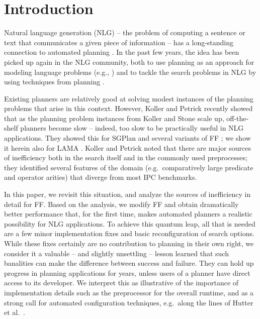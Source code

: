 
\section{Introduction} \label{sec:introduction}

Natural language generation (NLG) -- the problem of computing a
sentence or text that communicates a given piece of information -- has
a long-standing connection to automated planning \cite{perrault80}. In
the past few years, the idea has been picked up again in the NLG
community, both to use planning as an approach for modeling language
problems (e.g., \cite{Steedman-Petrick:07}) and to tackle the search
problems in NLG by using techniques from planning \cite{KolSto07}.

Existing planners are relatively good at solving modest instances of
the planning problems that arise in this context. However, Koller and
Petrick 
recently showed that as the planning problem instances from Koller and
Stone  scale up, off-the-shelf planners become
slow -- indeed, too slow to be practically useful in NLG
applications. They showed this for SGPlan and several variants of FF
\cite{HoffmannNebel01}; we show it herein also for LAMA
\cite{richter:etal:aaai-08}. Koller and Petrick noted that there are
major sources of inefficiency both in the search itself and in the
commonly used preprocesses; they identified several features of the
domain (e.g.\ comparatively large predicate and operator arities) that
diverge from most IPC benchmarks.

In this paper, we revisit this situation, and analyze the sources of
inefficiency in detail for FF. Based on the analysis, we modify FF and
obtain dramatically better performance that, for the first time, makes
automated planners a realistic possibility for NLG applications. To
achieve this quantum leap, all that is needed are a few minor
implementation fixes and basic reconfiguration of search
options. While these fixes certainly are no contribution to planning
in their own right, we consider it a valuable -- and slightly
unsettling -- lesson learned that such banalities can make the
difference between success and failure. They can hold up progress in
planning applications for years, unless users of a planner have direct
access to its developer. We interpret this as illustrative of the
importance of implementation details such as the preprocessor for the
overall runtime, and as a strong call for automated configuration
techniques, e.g.\ along the lines of Hutter et al.\
.


